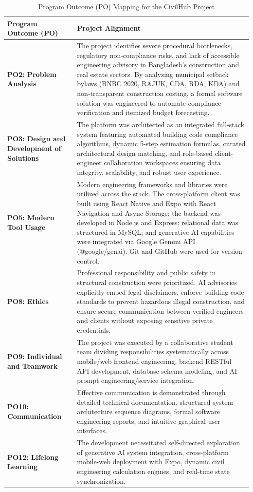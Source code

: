\documentclass[12pt,a4paper]{article}
\begin{document}
\begin{table}[htbp]
\centering
\caption{Program Outcome (PO) Mapping for the CivilHub Project}
\label{tab:po_mapping}
\renewcommand{\arraystretch}{1.3}
\begin{tabularx}{\linewidth}{|p{2.8cm}|X|}
\hline
\textbf{Program Outcome (PO)} & \textbf{Project Alignment} \\
\hline
\textbf{PO2: Problem Analysis} & 
The project identifies severe procedural bottlenecks, regulatory non-compliance risks, and lack of accessible engineering advisory in Bangladesh's construction and real estate sectors. By analyzing municipal setback bylaws (BNBC 2020, RAJUK, CDA, RDA, KDA) and non-transparent construction costing, a formal software solution was engineered to automate compliance verification and itemized budget forecasting. \\
\hline
\textbf{PO3: Design and Development of Solutions} & 
The platform was architected as an integrated full-stack system featuring automated building code compliance algorithms, dynamic 5-step estimation formulas, curated architectural design matching, and role-based client-engineer collaboration workspaces ensuring data integrity, scalability, and robust user experience. \\
\hline
\textbf{PO5: Modern Tool Usage} & 
Modern engineering frameworks and libraries were utilized across the stack. The cross-platform client was built using React Native and Expo with React Navigation and Async Storage; the backend was developed in Node.js and Express; relational data was structured in MySQL; and generative AI capabilities were integrated via Google Gemini API (@google/genai). Git and GitHub were used for version control. \\
\hline
\textbf{PO8: Ethics} & 
Professional responsibility and public safety in structural construction were prioritized. AI advisories explicitly embed legal disclaimers, enforce building code standards to prevent hazardous illegal construction, and ensure secure communication between verified engineers and clients without exposing sensitive private credentials. \\
\hline
\textbf{PO9: Individual and Teamwork} & 
The project was executed by a collaborative student team dividing responsibilities systematically across mobile/web frontend engineering, backend RESTful API development, database schema modeling, and AI prompt engineering/service integration. \\
\hline
\textbf{PO10: Communication} & 
Effective communication is demonstrated through detailed technical documentation, structured system architecture sequence diagrams, formal software engineering reports, and intuitive graphical user interfaces. \\
\hline
\textbf{PO12: Lifelong Learning} & 
The development necessitated self-directed exploration of generative AI system integration, cross-platform mobile-web deployment with Expo, dynamic civil engineering calculation engines, and real-time state synchronization. \\
\hline
\end{tabularx}
\end{table}
\end{document}
